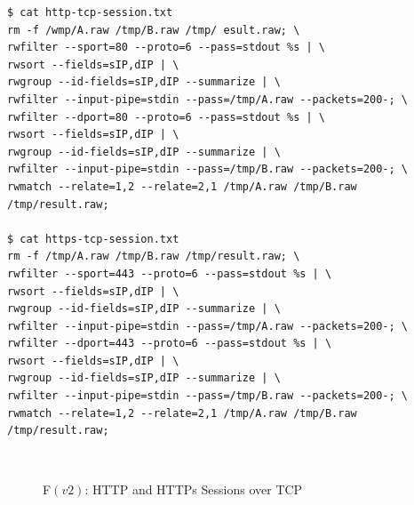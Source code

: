 \begin{lstlisting}
$ cat http-tcp-session.txt
rm -f /wmp/A.raw /tmp/B.raw /tmp/ esult.raw; \
rwfilter --sport=80 --proto=6 --pass=stdout %s | \
rwsort --fields=sIP,dIP | \
rwgroup --id-fields=sIP,dIP --summarize | \
rwfilter --input-pipe=stdin --pass=/tmp/A.raw --packets=200-; \
rwfilter --dport=80 --proto=6 --pass=stdout %s | \
rwsort --fields=sIP,dIP | \
rwgroup --id-fields=sIP,dIP --summarize | \
rwfilter --input-pipe=stdin --pass=/tmp/B.raw --packets=200-; \
rwmatch --relate=1,2 --relate=2,1 /tmp/A.raw /tmp/B.raw /tmp/result.raw;

$ cat https-tcp-session.txt
rm -f /tmp/A.raw /tmp/B.raw /tmp/result.raw; \
rwfilter --sport=443 --proto=6 --pass=stdout %s | \
rwsort --fields=sIP,dIP | \
rwgroup --id-fields=sIP,dIP --summarize | \
rwfilter --input-pipe=stdin --pass=/tmp/A.raw --packets=200-; \
rwfilter --dport=443 --proto=6 --pass=stdout %s | \
rwsort --fields=sIP,dIP | \
rwgroup --id-fields=sIP,dIP --summarize | \
rwfilter --input-pipe=stdin --pass=/tmp/B.raw --packets=200-; \
rwmatch --relate=1,2 --relate=2,1 /tmp/A.raw /tmp/B.raw /tmp/result.raw;
\end{lstlisting}

\begin{figure}[ht!]
\centering
{}\quad
{}\\
\caption{F$(v2)$: HTTP and HTTPs Sessions over TCP}
\label{fig:http-https-tcp-sessions}
\end{figure}




